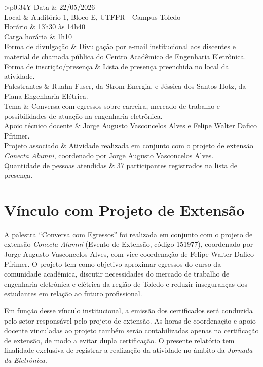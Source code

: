 \documentclass[12pt,a4paper]{article}
\newcommand{\infobox}[1]{%
    \vspace{0.2cm}
    \noindent
    \colorbox{softgray}{%
        \begin{minipage}{0.96\textwidth}
            \vspace{0.35cm}
            #1
            \vspace{0.35cm}
        \end{minipage}
    }
}
\begin{document}
\infobox{
\begin{tabularx}{\textwidth}{>{\bfseries}p{0.34\textwidth}Y}
Data & 22/05/2026 \\
Local & Auditório 1, Bloco E, UTFPR - Campus Toledo \\
Horário & 13h30 às 14h40 \\
Carga horária & 1h10 \\
Forma de divulgação & Divulgação por e-mail institucional aos discentes e material de chamada pública do Centro Acadêmico de Engenharia Eletrônica. \\
Forma de inscrição/presença & Lista de presença preenchida no local da atividade. \\
Palestrantes & Ruahn Fuser, da Strom Energia, e Jéssica dos Santos Hotz, da Piana Engenharia Elétrica. \\
Tema & Conversa com egressos sobre carreira, mercado de trabalho e possibilidades de atuação na engenharia eletrônica. \\
Apoio técnico docente & Jorge Augusto Vasconcelos Alves e Felipe Walter Dafico Pfrimer. \\
Projeto associado & Atividade realizada em conjunto com o projeto de extensão \textit{Conecta Alumni}, coordenado por Jorge Augusto Vasconcelos Alves. \\
Quantidade de pessoas atendidas & 37 participantes registrados na lista de presença. \\
\end{tabularx}
}

\section{Vínculo com Projeto de Extensão}

A palestra ``Conversa com Egressos'' foi realizada em conjunto com o projeto de extensão \textit{Conecta Alumni} (Evento de Extensão, código 151977), coordenado por Jorge Augusto Vasconcelos Alves, com vice-coordenação de Felipe Walter Dafico Pfrimer. O projeto tem como objetivo aproximar egressos do curso da comunidade acadêmica, discutir necessidades do mercado de trabalho de engenharia eletrônica e elétrica da região de Toledo e reduzir inseguranças dos estudantes em relação ao futuro profissional.

Em função desse vínculo institucional, a emissão dos certificados será conduzida pelo setor responsável pelo projeto de extensão. As horas de coordenação e apoio docente vinculadas ao projeto também serão contabilizadas apenas na certificação de extensão, de modo a evitar dupla certificação. O presente relatório tem finalidade exclusiva de registrar a realização da atividade no âmbito da \textit{Jornada da Eletrônica}.
\end{document}
